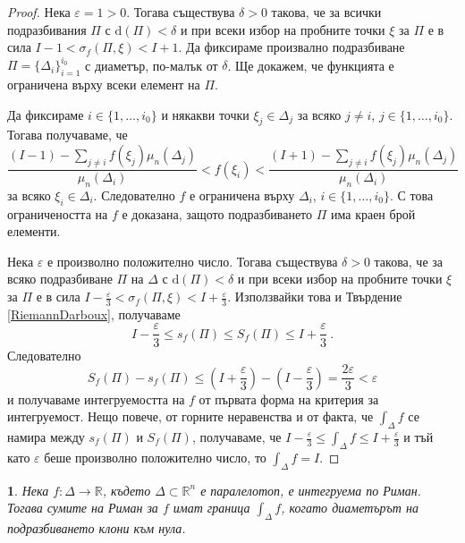 \documentclass[11pt]{article}
\numberwithin{equation}{section}
\numberwithin{figure}{section}
\numberwithin{table}{section}
\theoremstyle{plain}
\newtheorem{thm}{\protect\theoremname}[section]
\theoremstyle{definition}
\theoremstyle{remark}
\theoremstyle{definition}
\theoremstyle{remark}
\theoremstyle{plain}
\theoremstyle{definition}
\theoremstyle{definition}
\theoremstyle{plain}
\theoremstyle{plain}
\theoremstyle{plain}
\theoremstyle{definition}
\theoremstyle{plain}
\providecommand{\theoremname}{Теорема}
\newcommand*{\R}{\mathbb{R}}
\begin{document}
\begin{proof}
Нека $\varepsilon=1>0$. Тогава съществува $\delta>0$ такова, че за всички подразбивания $\Pi$ с $\textrm{d}(\Pi)<\delta$ и при всеки избор на пробните точки $\xi$ за $\Pi$ е в сила $I-1 < \sigma_f(\Pi, \xi)<I+1$. Да фиксираме произвално подразбиване $\Pi = \{\Delta_i \}_{i=1}^{i_0}$ с диаметър, по-малък от $\delta$. Ще докажем, че функцията е ограничена върху всеки елемент на $\Pi$.

Да фиксираме $i\in \{ 1,\dots ,i_0\}$ и някакви точки $\xi_j\in \Delta_j$ за всяко $j\neq i$, $j\in \{ 1,\dots ,i_0\}$. Тогава получаваме, че
$$\frac{(I-1)-\sum_{j\neq i} f(\xi_j) \mu_n(\Delta_j)}{\mu_n(\Delta_i)} < f(\xi_i) < \frac{(I+1) - \sum_{j\neq i} f(\xi_j)\mu_n(\Delta_j)}{\mu_n(\Delta_i)}$$
за всяко $\xi_i\in \Delta_i$. Следователно $f$ е ограничена върху $\Delta_i$, $i\in \{ 1,\dots ,i_0\}$. С това ограничеността на $f$ е доказана, защото подразбиването $\Pi$ има краен брой елементи.

Нека $\varepsilon$ е произволно положително число. Тогава съществува $\delta >0$ такова, че за всяко подразбиване $\Pi$ на $\Delta$ с $\textrm{d}(\Pi)<\delta$ и при всеки избор на пробните точки $\xi$ за $\Pi$ е в сила $I-\frac{\varepsilon}{3} < \sigma_f(\Pi, \xi)<I+\frac{\varepsilon}{3}$. Използвайки това и Твърдение \ref{RiemannDarboux}, получаваме
$$I-\frac{\varepsilon}{3} \le s_f(\Pi) \le S_f(\Pi) \le I+\frac{\varepsilon}{3} \ .$$
Следователно
$$S_f(\Pi)-s_f(\Pi)\le \left( I+\frac{\varepsilon}{3}\right)-\left( I-\frac{\varepsilon}{3}\right)=\frac{2\varepsilon}{3}< \varepsilon$$
и получаваме интегруемостта на $f$ от първата форма на критерия за интегруемост. Нещо повече, от горните неравенства и от факта, че $\int_\Delta f$ се намира между $s_f(\Pi)$ и $S_f(\Pi)$, получаваме, че $I-\frac{\varepsilon}{3} \le\int_\Delta f\le I+\frac{\varepsilon}{3}$ и тъй като $\varepsilon$ беше произволно положително число, то $\int_\Delta f =I$.
\end{proof}

\bigskip

\begin{thm}\label{hard_equivalence}
Нека $f:\Delta\rightarrow\R$, където $\Delta \subset \R^n$ е паралелотоп, е интегруема по Риман. Тогава сумите на Риман за $f$ имат граница $\int_\Delta f$, когато диаметърът на подразбиването клони към нула.
\end{thm}
\end{document}
